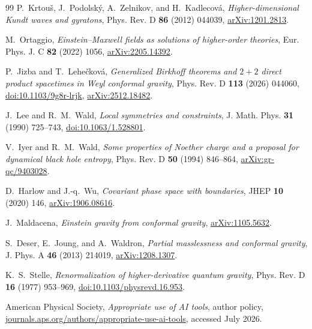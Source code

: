 \documentclass[11pt]{article}
\theoremstyle{remark}
\begin{document}
\begin{thebibliography}{99}
P.~Krtou\v{s}, J.~Podolsk\'y, A.~Zelnikov, and H.~Kadlecov\'a,
\emph{Higher-dimensional Kundt waves and gyratons},
Phys. Rev. D \textbf{86} (2012) 044039,
\href{https://arxiv.org/abs/1201.2813}{arXiv:1201.2813}.

M.~Ortaggio,
\emph{Einstein--Maxwell fields as solutions of higher-order theories},
Eur. Phys. J. C \textbf{82} (2022) 1056,
\href{https://arxiv.org/abs/2205.14392}{arXiv:2205.14392}.

P.~Jizba and T.~Lehe\v{c}kov\'a,
\emph{Generalized Birkhoff theorems and $2+2$ direct product spacetimes in
Weyl conformal gravity},
Phys. Rev. D \textbf{113} (2026) 044060,
\href{https://doi.org/10.1103/9g8r-lrjk}{doi:10.1103/9g8r-lrjk},
\href{https://arxiv.org/abs/2512.18482}{arXiv:2512.18482}.

J.~Lee and R.~M.~Wald,
\emph{Local symmetries and constraints},
J. Math. Phys. \textbf{31} (1990) 725--743,
\href{https://doi.org/10.1063/1.528801}{doi:10.1063/1.528801}.

V.~Iyer and R.~M.~Wald,
\emph{Some properties of Noether charge and a proposal for dynamical black
hole entropy},
Phys. Rev. D \textbf{50} (1994) 846--864,
\href{https://arxiv.org/abs/gr-qc/9403028}{arXiv:gr-qc/9403028}.

D.~Harlow and J.-q.~Wu,
\emph{Covariant phase space with boundaries},
JHEP \textbf{10} (2020) 146,
\href{https://arxiv.org/abs/1906.08616}{arXiv:1906.08616}.

J.~Maldacena,
\emph{Einstein gravity from conformal gravity},
\href{https://arxiv.org/abs/1105.5632}{arXiv:1105.5632}.

S.~Deser, E.~Joung, and A.~Waldron,
\emph{Partial masslessness and conformal gravity},
J. Phys. A \textbf{46} (2013) 214019,
\href{https://arxiv.org/abs/1208.1307}{arXiv:1208.1307}.

K.~S.~Stelle,
\emph{Renormalization of higher-derivative quantum gravity},
Phys. Rev. D \textbf{16} (1977) 953--969,
\href{https://doi.org/10.1103/physrevd.16.953}{doi:10.1103/physrevd.16.953}.

American Physical Society,
\emph{Appropriate use of AI tools}, author policy,
\href{https://journals.aps.org/authors/appropriate-use-ai-tools}%
{journals.aps.org/authors/appropriate-use-ai-tools}, accessed July 2026.
\end{thebibliography}
\end{document}
